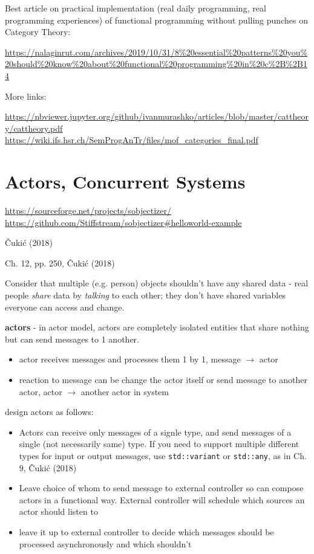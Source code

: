 \documentclass[10pt]{amsart}
\begin{document}
\begin{multicols*}{2}
Best article on practical implementation (real daily programming, real programming experiences) of functional programming without pulling punches on Category Theory:

\url{https://nalaginrut.com/archives/2019/10/31/8%20essential%20patterns%20you%20should%20know%20about%20functional%20programming%20in%20c%2B%2B14}

More links:

\url{https://nbviewer.jupyter.org/github/ivanmurashko/articles/blob/master/cattheory/cattheory.pdf}
\url{https://wiki.ifs.hsr.ch/SemProgAnTr/files/mof_categories_final.pdf}

\section{Actors, Concurrent Systems}

\url{https://sourceforge.net/projects/sobjectizer/}
\url{https://github.com/Stiffstream/sobjectizer#helloworld-example}

\v{C}uki\'{c} (2018) \cite{Cuki2018}

Ch. 12, pp. 250, \v{C}uki\'{c} (2018) \cite{Cuki2018}

Consider that multiple (e.g. person) objects shouldn't have any shared data - real people \emph{share} data by \emph{talking} to each other; they don't have shared variables everyone can access and change.

\textbf{actors} - in actor model, actors are completely isolated entities that share nothing but can send messages to 1 another.
\begin{itemize}
	\item actor receives messages and processes them 1 by 1, message $\to$ actor
	\item reaction to message can be change the actor itself or send message to another actor, actor $\to $ another actor in system
\end{itemize}

design actors as follows:

\begin{itemize}
	\item Actors can receive only messages of a signle type, and send messages of a single (not necessarily same) type. If you need to support multiple different types for input or output messages, use \verb|std::variant| or \verb|std::any|, as in Ch. 9, \v{C}uki\'{c} (2018) \cite{Cuki2008}
	\item Leave choice of whom to send message to external controller so can compose actors in a functional way. External controller will schedule which sources an actor should listen to
	\item leave it up to external controller to decide which messages should be processed asynchronously and which shouldn't
\end{itemize}


\end{multicols*}
\end{document}
